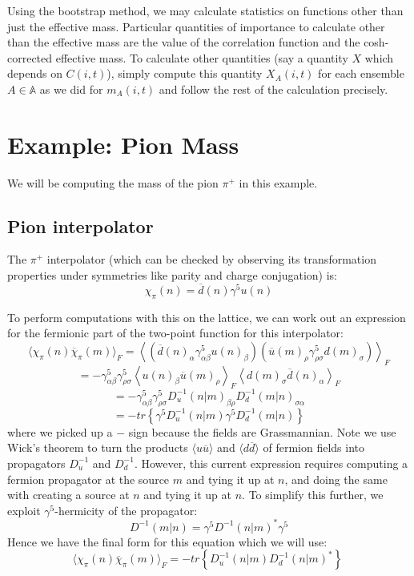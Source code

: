 \documentclass[11pt, oneside]{article}   	%
\theoremstyle{definition}
\begin{document}
Using the bootstrap method, we may calculate statistics on functions other than just the effective mass. Particular 
quantities of importance to calculate other than the effective mass are the value of the correlation function and the 
cosh-corrected effective mass. To calculate other quantities (say a quantity $X$ which depends on $C(i, t)$), simply 
compute this quantity $X_A(i, t)$ for each ensemble $A\in\mathbb A$ as we did for $m_A(i, t)$ and follow the rest of 
the calculation precisely. 

\newpage
\section{Example: Pion Mass}

We will be computing the mass of the pion $\pi^+$ in this example.

\subsection{Pion interpolator}

The $\pi^+$ interpolator (which can be checked by observing its transformation properties under symmetries like parity 
and charge conjugation) is:
\begin{equation}
	\chi_\pi(n) = \overline d(n)\gamma^5 u(n)
\end{equation}

To perform computations with this on the lattice, we can work out an expression for the fermionic part of the 
two-point function for this interpolator:
$$
	\langle\chi_\pi(n)\overline\chi_\pi(m)\rangle_F = \left\langle \left(\overline d(n)_\alpha \gamma^5_{\alpha\beta} 
	u(n)_\beta\right)\left(\overline u(m)_\rho\gamma^5_{\rho\sigma} d(m)_\sigma\right)\right\rangle_F
$$
$$
	= -\gamma^5_{\alpha\beta}\gamma^5_{\rho\sigma}\left\langle u(n)_\beta \overline u(m)_\rho\right\rangle_F
	\left\langle d(m)_\sigma\overline d(n)_\alpha\right\rangle_F
$$
$$
	= -\gamma_{\alpha\beta}^5\gamma_{\rho\sigma}^5 D^{-1}_u(n | m)_{\beta\rho} D^{-1}_d (m | n)_{\sigma\alpha}
$$
$$
	= -tr\left\{\gamma^5 D^{-1}_u (n | m) \gamma^5 D^{-1}_d (m | n)\right\}
$$
where we picked up a $-$ sign because the fields are Grassmannian. Note we use Wick's theorem to turn the products 
$\langle u \overline u\rangle$ and $\langle d\overline d\rangle$ of fermion fields into propagators $D^{-1}_u$ and 
$D^{-1}_d$. However, this current expression requires computing a fermion propagator at the source $m$ and tying 
it up at $n$, and doing the same with creating a source at $n$ and tying it up at $n$. To simplify this further, we 
exploit $\gamma^5$-hermicity of the propagator:
\begin{equation}
	D^{-1}(m | n) = \gamma^5 D^{-1}(n | m)^*\gamma^5
\end{equation}
Hence we have the final form for this equation which we will use:
\begin{equation}
	\langle\chi_\pi(n)\overline\chi_\pi(m)\rangle_F = - tr\left\{D^{-1}_u (n | m) D^{-1}_d (n | m)^*\right\}~
	\label{eq:correlator}
\end{equation}
\end{document}
